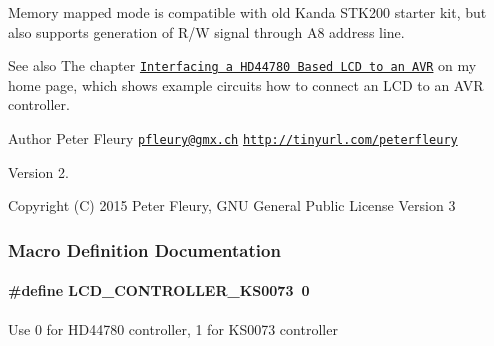 Memory mapped mode is compatible with old Kanda S\+T\+K200 starter kit, but also supports generation of R/W signal through A8 address line.

\begin{DoxySeeAlso}{See also}
The chapter \href{ http://homepage.hispeed.ch/peterfleury/avr-lcd44780.html}{\tt Interfacing a H\+D44780 Based L\+CD to an A\+VR} on my home page, which shows example circuits how to connect an L\+CD to an A\+VR controller.
\end{DoxySeeAlso}
\begin{DoxyAuthor}{Author}
Peter Fleury \href{mailto:pfleury@gmx.ch}{\tt pfleury@gmx.\+ch} \href{http://tinyurl.com/peterfleury}{\tt http\+://tinyurl.\+com/peterfleury}
\end{DoxyAuthor}
\begin{DoxyVersion}{Version}
2.
\end{DoxyVersion}
\begin{DoxyCopyright}{Copyright}
(C) 2015 Peter Fleury, G\+NU General Public License Version 3 
\end{DoxyCopyright}


\subsubsection{Macro Definition Documentation}
\paragraph[{\texorpdfstring{L\+C\+D\+\_\+\+C\+O\+N\+T\+R\+O\+L\+L\+E\+R\+\_\+\+K\+S0073}{LCD_CONTROLLER_KS0073}}]{\setlength{\rightskip}{0pt plus 5cm}\#define L\+C\+D\+\_\+\+C\+O\+N\+T\+R\+O\+L\+L\+E\+R\+\_\+\+K\+S0073~0}\hypertarget{a00010_ga63574b03f72a197aeee823aae95dc3b7}{}\label{a00010_ga63574b03f72a197aeee823aae95dc3b7}
Use 0 for H\+D44780 controller, 1 for K\+S0073 controller 
